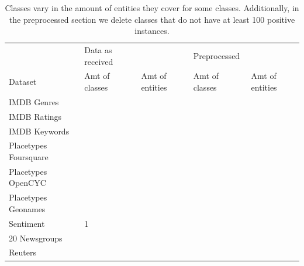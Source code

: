 \begin{table}[]
	\begin{tabular}{lllll}
		& Data as received &                 & Preprocessed   &                 \\
		Dataset               & Amt of classes   & Amt of entities & Amt of classes & Amt of entities \\
		IMDB Genres           &                  &                 &                &                 \\
		IMDB Ratings          &                  &                 &                &                 \\
		IMDB Keywords         &                  &                 &                &                 \\
		Placetypes Foursquare &                  &                 &                &                 \\
		Placetypes OpenCYC    &                  &                 &                &                 \\
		Placetypes Geonames   &                  &                 &                &                 \\
		Sentiment             &  1                &                 &                &                 \\
		20 Newsgroups         &                  &                 &                &                 \\
		Reuters               &                  &                 &                &                
	\end{tabular}
\caption{Classes vary in the amount of entities they cover for some classes. Additionally, in the preprocessed section we delete classes that do not have at least 100 positive instances.}
\label{table:ClassStats}
\end{table}

